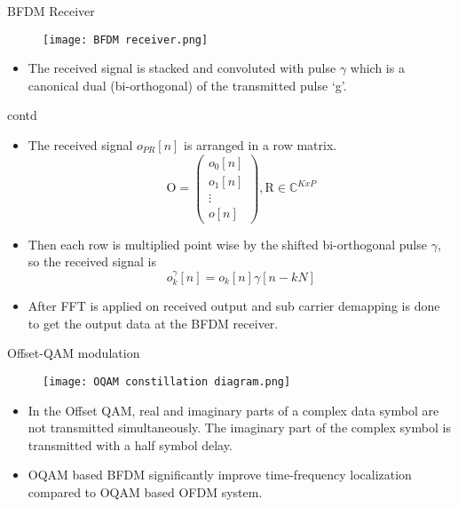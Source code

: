 \documentclass{beamer}
\begin{document}
\begin{frame}{BFDM Receiver}
 \begin{figure}[ht]
    \texttt{[image: BFDM receiver.png]}
    \label{BFDM Reciver}
    \end{figure}
    \begin{itemize}
    \item The received signal is stacked and convoluted with pulse $\gamma$ which is a canonical dual (bi-orthogonal) of the transmitted pulse ‘g’.
        
    \end{itemize}
\end{frame}
\begin{frame}{contd}
\begin{itemize}
    \item The received signal $o_{PR}[n]$ is arranged in a row matrix.\\
        \begin{equation*}{\text{O}} = \left( \begin{array}{c} {{o_0}[n]} \\ {{o_1}[n]} \\ \vdots \\ {o[n]} \end{array} \right),{\text{R}} \in {\mathbb{C}^{KxP}}\tag{3}\end{equation*}
    \item Then each row is multiplied point wise by the shifted bi-orthogonal pulse $\gamma$, so the received signal is\\
    \begin{equation*}o_k^\gamma [n] = {o_k}[n]\gamma [n-kN]\tag{4}\end{equation*}
    \item After FFT is applied on received output and sub carrier demapping is done to get the output data at the BFDM receiver.
\end{itemize}
\end{frame}
\begin{frame}{Offset-QAM modulation}
\begin{figure}[ht]
    \texttt{[image: OQAM constillation diagram.png]}
    \label{BFDM Reciver}
    \end{figure}
    \begin{itemize}
        \item In the Offset QAM, real and imaginary parts of a complex data symbol are not transmitted simultaneously. The imaginary part of the complex symbol is transmitted with a half symbol delay.
        \item  OQAM based BFDM significantly improve time-frequency localization compared to OQAM based OFDM system.
    \end{itemize}
\end{frame}
\end{document}

